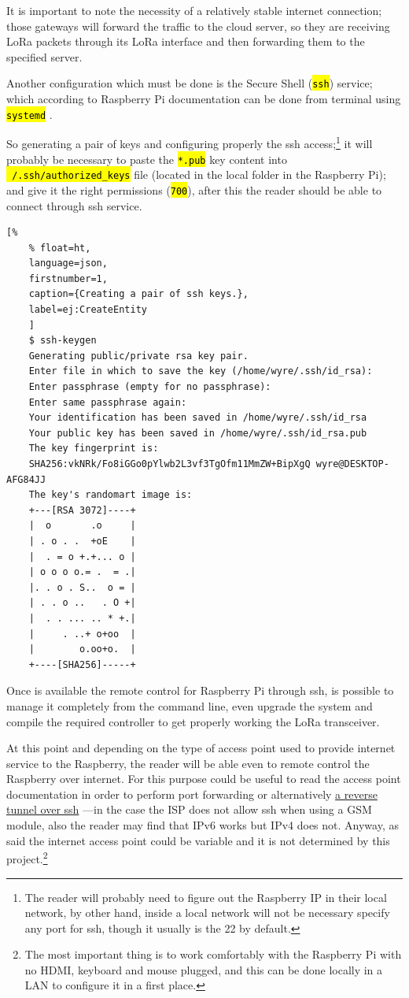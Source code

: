 \documentclass[11pt,a4paper,dvipsnames,twoside]{article}
\newcommand{\cmd}[1] {\hl{\texttt{#1}}}
\begin{document}
It is important to note the necessity of a relatively stable internet connection; those gateways will forward the traffic to the cloud server, so they are receiving LoRa packets through its LoRa interface and then forwarding them to the specified server. 

Another configuration which must be done is the Secure Shell (\cmd{ssh}) service; which according to Raspberry Pi documentation can be done from terminal using \cmd{systemd} \cite{RaspiSSH}. 

So generating a pair of keys and configuring properly the ssh access;\footnote{The reader will probably need to figure out the Raspberry IP in their local network, by other hand, inside a local network will not be necessary specify any port for ssh, though it usually is the 22 by default.} it will probably be necessary to paste the \cmd{*.pub} key content into \cmd{~/.ssh/authorized\_keys} file (located in the local folder in the Raspberry Pi); and give it the right permissions (\cmd{700}), after this the reader should be able to connect through ssh service.

\begin{lstlisting}[%
    % float=ht,
    language=json,
    firstnumber=1,
    caption={Creating a pair of ssh keys.},
    label=ej:CreateEntity
    ]
    $ ssh-keygen
    Generating public/private rsa key pair.
    Enter file in which to save the key (/home/wyre/.ssh/id_rsa): 
    Enter passphrase (empty for no passphrase): 
    Enter same passphrase again: 
    Your identification has been saved in /home/wyre/.ssh/id_rsa
    Your public key has been saved in /home/wyre/.ssh/id_rsa.pub
    The key fingerprint is:
    SHA256:vkNRk/Fo8iGGo0pYlwb2L3vf3TgOfm11MmZW+BipXgQ wyre@DESKTOP-AFG84JJ
    The key's randomart image is:
    +---[RSA 3072]----+
    |  o       .o     |
    | . o . .  +oE    |
    |  . = o +.+... o |
    | o o o o.= .  = .|
    |. . o . S..  o = |
    | . . o ..   . O +|
    |  . . ... .. * +.|
    |     . ..+ o+oo  |
    |        o.oo+o.  |
    +----[SHA256]-----+
\end{lstlisting}

Once is available the remote control for Raspberry Pi through ssh, is possible to manage it completely from the command line, even upgrade the system and compile the required controller to get properly working the LoRa transceiver. 

At this point and depending on the type of access point used to provide internet service to the Raspberry, the reader will be able even to remote control the Raspberry over internet. For this purpose could be useful to read the access point documentation in order to perform port forwarding or alternatively \href{http://www.thirdway.ch/En/projects/raspberry_pi_3g/index.php}{a reverse tunnel over ssh} ---in the case the ISP does not allow ssh when using a GSM module, also the reader may find that IPv6 works but IPv4 does not. Anyway, as said the internet access point could be variable and it is not determined by this project.\footnote{The most important thing is to work comfortably with the Raspberry Pi with no HDMI, keyboard and mouse plugged, and this can be done locally in a LAN to configure it in a first place.}  
\end{document}
